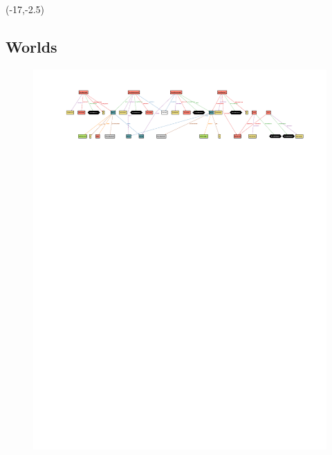 \documentclass[table, 12pt]{article}
\begin{document}
\begin{landscape}
    \begin{textblock}{20}(-17,-2.5){}
        \subsection{Worlds}
        \begin{figure}[H]
            \vspace{100px}
            \hspace{-100px}
            \includegraphics[scale=1.5]{assets/Alloy-Analyzer/world.pdf}
        \end{figure}
    \end{textblock}
    \begin{figure}[H]
        \vspace*{-100px}
        \hspace*{-170px}

\end{figure}
\end{landscape}
\end{document}
